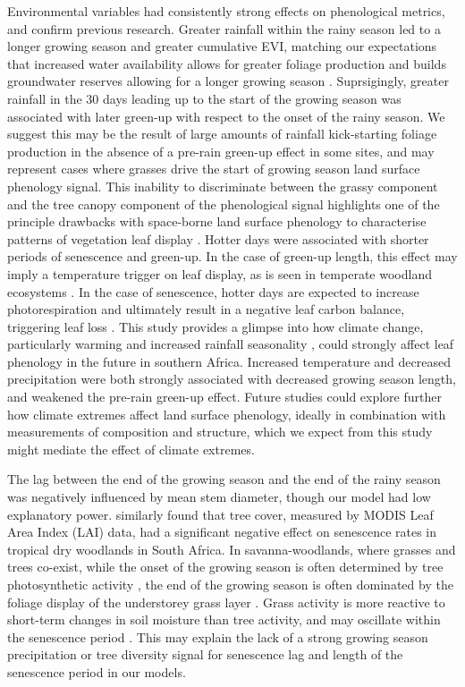 \documentclass[11pt,a4paper]{article}
\begin{document}
Environmental variables had consistently strong effects on phenological
metrics, and confirm previous research. Greater rainfall within the rainy
season led to a longer growing season and greater cumulative EVI, matching our
expectations that increased water availability allows for greater foliage
production and builds groundwater reserves allowing for a longer growing season
\citep{Adole2018a}. Suprsigingly, greater rainfall in the 30 days leading up to the start of
the growing season was associated with later green-up with respect to the onset
of the rainy season. We suggest this may be the result of large amounts of
rainfall kick-starting foliage production in the absence of a pre-rain green-up
effect in some sites, and may represent cases where grasses drive the start of
growing season land surface phenology signal. This inability to discriminate
between the grassy component and the tree canopy component of the phenological
signal highlights one of the principle drawbacks with space-borne land surface
phenology to characterise patterns of vegetation leaf display \citep{Archibald2007}. Hotter days were
associated with shorter periods of senescence and green-up. In the case of
green-up length, this effect may imply a temperature trigger on leaf display,
as is seen in temperate woodland ecosystems \citep{Flynn2018}. In the case of
senescence, hotter days are expected to increase photorespiration and
ultimately result in a negative leaf carbon balance, triggering leaf loss
\citep{Warren2011, Marin2019}. This study provides a glimpse into how climate
change, particularly warming \citep{IPCC} and increased rainfall seasonality
\citep{Wainwright2021}, could strongly affect leaf phenology in the future in
southern Africa. Increased temperature and decreased precipitation were both
strongly associated with decreased growing season length, and weakened the
pre-rain green-up effect. Future studies could explore
further how climate extremes affect land surface phenology, ideally in
combination with measurements of composition and structure, which we expect
from this study might mediate the effect of climate extremes.

The lag between the end of the growing season and the end of the rainy season
was negatively influenced by mean stem diameter, though our model had low
explanatory power. \citet{Cho2017} similarly found that tree cover, measured by
MODIS Leaf Area Index (LAI) data, had a significant negative effect on
senescence rates in tropical dry woodlands in South Africa. In
savanna-woodlands, where grasses and trees co-exist, while the onset of the
growing season is often determined by tree photosynthetic activity
\citep{Ryan2017, Archibald2007, Chidumayo2001}, the end of the growing season
is often dominated by the foliage display of the understorey grass layer
\citep{Cho2017, Guan2014}. Grass activity is more reactive to short-term
changes in soil moisture than tree activity, and may oscillate within the
senescence period \citep{Archibald2007}. This may explain the lack of a strong
growing season precipitation or tree diversity signal for senescence lag and
length of the senescence period in our models.
\end{document}

